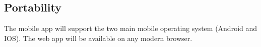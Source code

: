 \subsection{Portability}
The mobile app will support the two main mobile operating system (Android and IOS). The web app will be available on any modern browser.